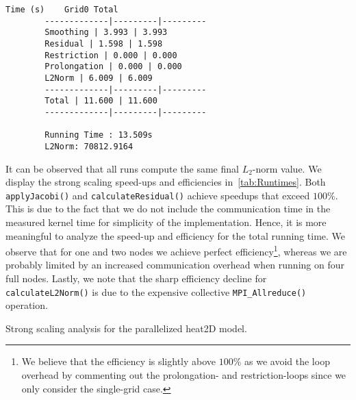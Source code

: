 \documentclass{article}
\begin{document}
    \begin{lstlisting}[basicstyle=\scriptsize, caption={Output from running
    the parallelized model on two full nodes.}, label={lst:FourNodes}]
        Time (s)    Grid0 Total
        -------------|---------|---------
        Smoothing | 3.993 | 3.993
        Residual | 1.598 | 1.598
        Restriction | 0.000 | 0.000
        Prolongation | 0.000 | 0.000
        L2Norm | 6.009 | 6.009
        -------------|---------|---------
        Total | 11.600 | 11.600
        -------------|---------|---------

        Running Time : 13.509s
        L2Norm: 70812.9164
    \end{lstlisting}

    \newpage

    It can be observed that all runs compute the same final $L_2$-norm value.
    We display the strong scaling speed-ups and efficiencies
    in~\cref{tab:Runtimes}.
    Both \lstinline{applyJacobi()} and \lstinline{calculateResidual()}
    achieve speedups that exceed $100$\%.
    This is due to the fact that we do not include the communication time in
    the measured kernel time for simplicity of the implementation.
    Hence, it is more meaningful to analyze the speed-up and efficiency for
    the total running time.
    We observe that for one and two nodes we achieve perfect
    efficiency\footnote{We believe that the efficiency is slightly above
    $100$\% as we avoid the loop overhead by commenting out the prolongation-
    and restriction-loops since we only consider the single-grid case.},
    whereas we are probably limited by an increased communication overhead
    when running on four full nodes.
    Lastly, we note that the sharp efficiency decline for
    \lstinline{calculateL2Norm()} is due to the expensive collective
    \lstinline{MPI_Allreduce()} operation.

    \begin{table}
        \caption{Strong scaling analysis for the parallelized heat2D model.}
        \label{tab:Runtimes}
        \begin{center}
            \resizebox{.5\textwidth}{!}{  }
        \end{center}
    \end{table}

    \begin{table}
        \caption{}
        \label{tab:StrongScaling}
        \resizebox{\textwidth}{!}{  }
    \end{table}
    \begin{table}
        \caption{}
        \label{tab:WeakScaling}
        \resizebox{\textwidth}{!}{  }
    \end{table}
\end{document}

